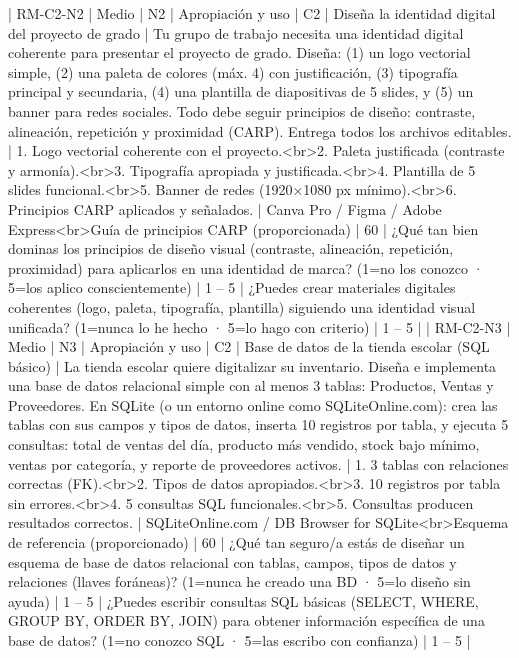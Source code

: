 | RM-C2-N2 | Medio | N2 | Apropiación y uso | C2 | Diseña la identidad digital del proyecto de grado | Tu grupo de trabajo necesita una identidad digital coherente para presentar el proyecto de grado. Diseña: (1) un logo vectorial simple, (2) una paleta de colores (máx. 4) con justificación, (3) tipografía principal y secundaria, (4) una plantilla de diapositivas de 5 slides, y (5) un banner para redes sociales. Todo debe seguir principios de diseño: contraste, alineación, repetición y proximidad (CARP). Entrega todos los archivos editables. | 1. Logo vectorial coherente con el proyecto.<br>2. Paleta justificada (contraste y armonía).<br>3. Tipografía apropiada y justificada.<br>4. Plantilla de 5 slides funcional.<br>5. Banner de redes (1920×1080 px mínimo).<br>6. Principios CARP aplicados y señalados. | Canva Pro / Figma / Adobe Express<br>Guía de principios CARP (proporcionada) | 60 | ¿Qué tan bien dominas los principios de diseño visual (contraste, alineación, repetición, proximidad) para aplicarlos en una identidad de marca? (1=no los conozco · 5=los aplico conscientemente) | 1 – 5 | ¿Puedes crear materiales digitales coherentes (logo, paleta, tipografía, plantilla) siguiendo una identidad visual unificada? (1=nunca lo he hecho · 5=lo hago con criterio) | 1 – 5 |
| RM-C2-N3 | Medio | N3 | Apropiación y uso | C2 | Base de datos de la tienda escolar (SQL básico) | La tienda escolar quiere digitalizar su inventario. Diseña e implementa una base de datos relacional simple con al menos 3 tablas: Productos, Ventas y Proveedores. En SQLite (o un entorno online como SQLiteOnline.com): crea las tablas con sus campos y tipos de datos, inserta 10 registros por tabla, y ejecuta 5 consultas: total de ventas del día, producto más vendido, stock bajo mínimo, ventas por categoría, y reporte de proveedores activos. | 1. 3 tablas con relaciones correctas (FK).<br>2. Tipos de datos apropiados.<br>3. 10 registros por tabla sin errores.<br>4. 5 consultas SQL funcionales.<br>5. Consultas producen resultados correctos. | SQLiteOnline.com / DB Browser for SQLite<br>Esquema de referencia (proporcionado) | 60 | ¿Qué tan seguro/a estás de diseñar un esquema de base de datos relacional con tablas, campos, tipos de datos y relaciones (llaves foráneas)? (1=nunca he creado una BD · 5=lo diseño sin ayuda) | 1 – 5 | ¿Puedes escribir consultas SQL básicas (SELECT, WHERE, GROUP BY, ORDER BY, JOIN) para obtener información específica de una base de datos? (1=no conozco SQL · 5=las escribo con confianza) | 1 – 5 |
